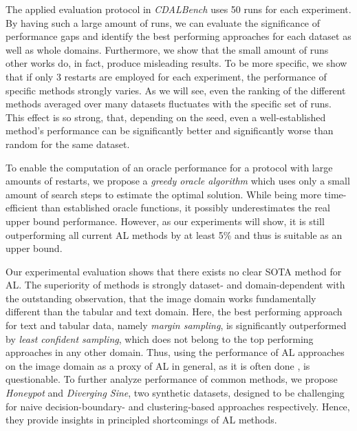 \documentclass[]{article}
\begin{document}
The applied evaluation protocol in \emph{CDALBench} uses 50 runs for
each experiment. By having such a large amount of runs, we can evaluate the
significance of performance gaps and identify the best performing
approaches for each dataset as well as whole domains. 
Furthermore, we show that the small amount of runs other works do, in fact, 
produce misleading results. 
To be more specific, we show that if only 3 restarts are employed for each experiment, 
the performance of specific methods strongly varies. As we will see, even the ranking of
the different methods averaged over many datasets fluctuates with the specific set of runs. 
This effect is so strong, that, depending on the seed, even a well-established method's performance can be significantly better and significantly worse than random for the same dataset. 

To enable the computation of an oracle performance for a protocol with large amounts of restarts,
we propose a \emph{greedy oracle algorithm} 
which uses only a small amount of search steps to estimate the
optimal solution. While being more time-efficient than established oracle
functions, it possibly underestimates the real upper bound performance. 
However, as our experiments will show, it is still outperforming all current AL methods
by at least 5\% and thus is suitable as an upper bound.

Our experimental evaluation shows that there exists no clear SOTA
method for AL. The superiority of methods is strongly dataset- and
domain-dependent with the outstanding observation, that the image domain works
fundamentally different than the tabular and text domain. Here, the best
performing approach for text and tabular data, namely \emph{margin sampling}, is
significantly outperformed by \emph{least confident sampling}, which does not belong to
the top performing approaches in any other domain. Thus, using the performance
of AL approaches on the image domain as a proxy of AL
in general, as it is often done \cite{beck2021effective, munjal2022towards, li2022empirical, ji2023randomness, luth2024navigating}, is questionable. To further analyze
performance of common methods, we propose \emph{Honeypot} and \emph{Diverging Sine}, two
synthetic datasets, designed to be challenging for naive decision-boundary- and clustering-based approaches respectively. Hence, they provide insights in principled shortcomings of AL methods.
\end{document}
